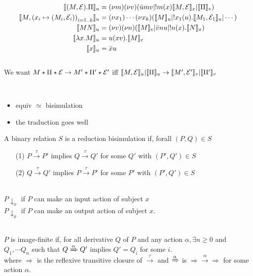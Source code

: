 \documentclass[a4paper,12pt]{book}
\begin{document}
\begin{align*}
\llbracket (M,\mathcal{E}).\Pi \rrbracket_u &= (\nu m)(\nu v)(\bar{u}mv|!m(x)\llbracket M,\mathcal{E}\rrbracket_x|\llbracket\Pi\rrbracket_v)\\
\llbracket M,\left( x_i\mapsto(M_i,\mathcal{E}_i)\right)_{i=1..k}\rrbracket_u &= (\nu x_1)\cdots(\nu x_k)(\llbracket M\rrbracket_u|!x_1(u).\llbracket M_1,\mathcal{E}_1\rrbracket_u | \cdots)\\
\llbracket MN \rrbracket_u &= (\nu v) (\nu n) (\llbracket M \rrbracket_v | \bar{v}nu|!n(x).\llbracket N\rrbracket_x)\\
\llbracket\lambda x.M\rrbracket_u &= u (xv).\llbracket M\rrbracket_v\\
\llbracket x\rrbracket_u &= \bar{x}u
\end{align*}
~\\
We want $M\star\Pi\star\mathcal{E}\rightarrow M'\star\Pi'\star\mathcal{E}'$ iff $\llbracket M,\mathcal{E}\rrbracket_u|\llbracket\Pi\rrbracket_u\rightarrow\llbracket M',\mathcal{E}'\rrbracket_v|\llbracket\Pi'\rrbracket_v$

~\\

\begin{itemize}
	\item equiv $\simeq$ bisimulation
	\item the traduction goes well
\end{itemize}
\newpage

\begin{definition}
A binary relation $S$ is a reduction bisimulation if, forall $(P,Q)\in S$\\
\begin{itemize}
	\item[(1)] $P\xrightarrow{\tau}P'$ implies $Q\xrightarrow{\tau}Q'$ for some $Q'$ with $(P',Q')\in S$
	\item[(2)] $Q\xrightarrow{\tau}Q'$ implies $P\xrightarrow{\tau}P'$ for some $P'$ with $(P',Q')\in S$
\end{itemize}
\end{definition}


\begin{definition}[Observability:]\\
$P\downarrow_{x}$ if $P$ can make an input action of subject $x$\\
$P\downarrow_{\bar{x}}$ if $P$ can make an output action of subject $x$.
\end{definition}


\begin{definition}\\
$P$ is image-finite if, for all derivative $Q$ of $P$ and any action $\alpha, \exists n\geq0$ and $Q_1,\cdots Q_n$ such that $Q\xRightarrow{\alpha}Q'$ implies $Q'=Q_i$ for some $i$.\\
where $\Rightarrow$ is the reflexive transitive closure of $\xrightarrow{\tau}$ and $\xRightarrow{\alpha}$ is $\Rightarrow\xrightarrow{\alpha}\Rightarrow$ for some action $\alpha$.
\end{definition}
\end{document}
